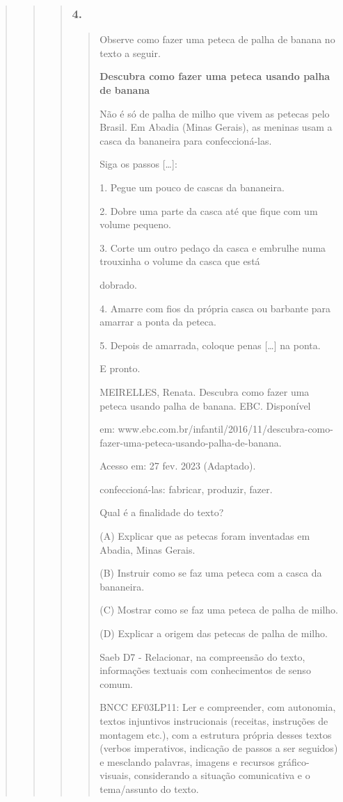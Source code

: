 \begin{quote}
\begin{quote}
\begin{quote}
\subsubsection{4. }\label{section-87}

\begin{quote}
Observe como fazer uma peteca de palha de banana no texto a seguir.

\textbf{Descubra como fazer uma peteca usando palha de banana}

Não é só de palha de milho que vivem as petecas pelo Brasil. Em Abadia
(Minas Gerais), as meninas usam a casca da bananeira para
confeccioná-las.

Siga os passos {[}\ldots{}{]}:

1. Pegue um pouco de cascas da bananeira.

2. Dobre uma parte da casca até que fique com um volume pequeno.

3. Corte um outro pedaço da casca e embrulhe numa trouxinha o volume da
casca que está

dobrado.

4. Amarre com fios da própria casca ou barbante para amarrar a ponta da
peteca.

5. Depois de amarrada, coloque penas {[}\ldots{}{]} na ponta.

E pronto.

MEIRELLES, Renata. Descubra como fazer uma peteca usando palha de
banana. EBC. Disponível

em:
www.ebc.com.br/infantil/2016/11/descubra-como-fazer-uma-peteca-usando-palha-de-banana.

Acesso em: 27 fev. 2023 (Adaptado).

confeccioná-las: fabricar, produzir, fazer.

Qual é a finalidade do texto?

(A) Explicar que as petecas foram inventadas em Abadia, Minas Gerais.

(B) Instruir como se faz uma peteca com a casca da bananeira.

(C) Mostrar como se faz uma peteca de palha de milho.

(D) Explicar a origem das petecas de palha de milho.

Saeb D7 - Relacionar, na compreensão do texto, informações textuais com
conhecimentos de senso comum.

BNCC EF03LP11: Ler e compreender, com autonomia, textos injuntivos
instrucionais (receitas, instruções de montagem etc.), com a estrutura
própria desses textos (verbos imperativos, indicação de passos a ser
seguidos) e mesclando palavras, imagens e recursos gráfico- visuais,
considerando a situação comunicativa e o tema/assunto do texto.


\end{quote}
\end{quote}
\end{quote}
\end{quote}
